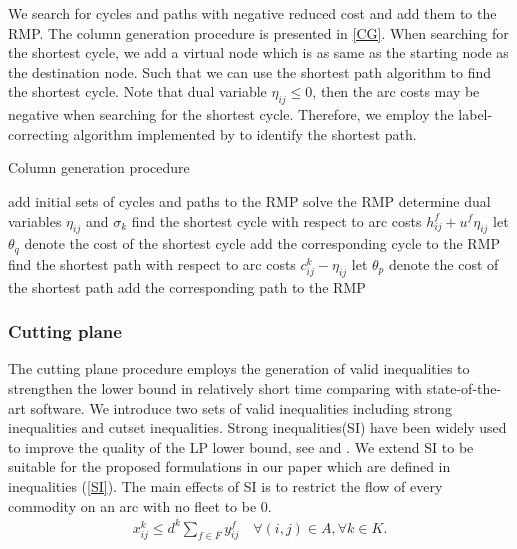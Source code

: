 \documentclass[11pt,nonblindrev,fleqn]{article}
\begin{document}
We search for cycles and paths with negative reduced cost and add them to the RMP. The column generation procedure is presented in \ref{CG}. When searching for the shortest cycle, we add a virtual node which is as same as the starting node as the destination node. Such that we can use the shortest path algorithm to find the shortest cycle. Note that dual variable $\eta_{ij} \leq 0$, then the arc costs may be negative when searching for the shortest cycle. Therefore, we employ the label-correcting algorithm implemented by \cite{Ahuja1993Network} to identify the shortest path.

\vspace{.25in}
\begin{algorithm}[H] \label{CG}
\caption{Column generation procedure}
\LinesNumbered
\SetNlSkip{1.2em}
add initial sets of cycles and paths to the RMP\;
{
    solve the RMP\;
    determine dual variables $\eta_{ij}$ and $\sigma_k$\;
    {
        find the shortest cycle with respect to arc costs $h_{ij}^f + u^f \eta_{ij}$\;
        let $\theta_q$ denote the cost of the shortest cycle\;
        {
            add the corresponding cycle to the RMP\;
        }
    }
    {
        find the shortest path with respect to arc costs $c_{ij}^k - \eta_{ij}$\;
        let $\theta_p$ denote the cost of the shortest path\;
        {
            add the corresponding path to the RMP\;
        }
    }
}
\end{algorithm}

\subsubsection{Cutting plane}
The cutting plane procedure employs the generation of valid inequalities to strengthen the lower bound in relatively short time comparing with state-of-the-art software. We introduce two sets of valid inequalities including strong inequalities and cutset inequalities. Strong inequalities(SI) have been widely used to improve the quality of the LP lower bound, see \cite{Gendron1994RELAXATIONS,Gendron1999Multicommodity} and \cite{Chouman2015Cutting}. We extend SI to be suitable for the proposed formulations in our paper which are defined in inequalities (\ref{SI}). The main effects of SI is to restrict the flow of every commodity on an arc with no fleet to be 0.
\begin{align}\label{SI}
  x_{ij}^k \leq d^k \sum_{f\in F} y_{ij}^f      \quad       \forall (i,j)\in A, \forall k\in K.
\end{align}
\end{document}
